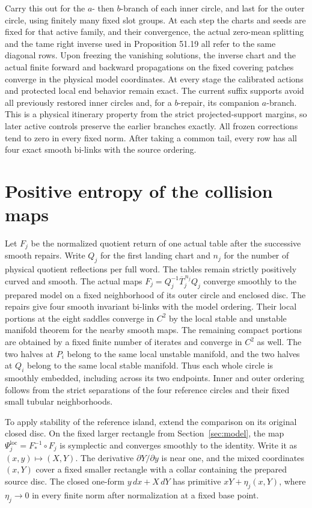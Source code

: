 \documentclass[11pt]{article}
\begin{document}
Carry this out for the \(a\)- then \(b\)-branch of each inner circle, and last
for the outer circle, using finitely many fixed slot groups. At each step the
charts and seeds are fixed for that active family, and their convergence, the
actual zero-mean splitting and the tame right inverse used in Proposition 51.19
all refer to the same diagonal rows. Upon freezing the vanishing solutions, the
inverse chart and the actual finite forward and backward propagations on the
fixed covering patches converge in the physical model coordinates. At every
stage the calibrated actions and protected local end behavior remain exact. The
current suffix supports avoid all previously restored inner circles and, for a
\(b\)-repair, its companion \(a\)-branch. This is a physical itinerary property
from the strict projected-support margins, so later active controls preserve the
earlier branches exactly. All frozen corrections tend to zero in every fixed
norm. After taking a common tail, every row has all four exact smooth bi-links
with the source ordering.

\section{Positive entropy of the collision maps}\label{sec:entropy}

Let \(F_j\) be the normalized quotient return of one actual table after the
successive smooth repairs. Write \(Q_j\) for the first landing chart and \(n_j\)
for the number of physical quotient reflections per full word. The tables remain
strictly positively curved and smooth. The actual maps
\(F_j=Q_j^{-1}\overline T_j^{\,n_j}Q_j\) converge smoothly to the prepared model
on a fixed neighborhood of its outer circle and enclosed disc. The repairs give
four smooth invariant bi-links with the model ordering. Their local portions at
the eight saddles converge in \(C^2\) by the local stable and unstable manifold
theorem for the nearby smooth maps. The remaining compact portions are obtained
by a fixed finite number of iterates and converge in \(C^2\) as well. The two
halves at \(P_i\) belong to the same local unstable manifold, and the two halves
at \(Q_i\) belong to the same local stable manifold. Thus each whole circle is
smoothly embedded, including across its two endpoints. Inner and outer ordering
follows from the strict separations of the four reference circles and their
fixed small tubular neighborhoods.

To apply stability of the reference island, extend the comparison on its
original closed disc. On the fixed larger rectangle from
Section~\ref{sec:model}, the map
\(\Psi_j^{\mathrm{loc}}=F_*^{-1}\circ F_j\) is symplectic and converges smoothly
to the identity. Write it as \((x,y)\mapsto(X,Y)\). The derivative
\(\partial Y/\partial y\) is near one, and the mixed coordinates \((x,Y)\) cover
a fixed smaller rectangle with a collar containing the prepared source disc. The
closed one-form \(y\,dx+X\,dY\) has primitive \(xY+\eta_j(x,Y)\), where
\(\eta_j\to0\) in every finite norm after normalization at a fixed base point.
\end{document}
